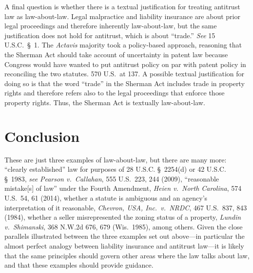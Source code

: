 \documentclass[
  12pt,
  letterpaper,
]{scrartcl}
\begin{document}
A final question is whether there is a textual justification for treating
antitrust law as law-about-law. Legal malpractice and liability insurance are
about prior legal proceedings and therefore inherently law-about-law, but the
same justification does not hold for antitrust, which is about ``trade.''
\textit{See} 15 U.S.C.~§~1. The \textit{Actavis} majority took a policy-based
approach, reasoning that the Sherman Act should take account of uncertainty in
patent law because Congress would have wanted to put antitrust policy on par
with patent policy in reconciling the two statutes. 570 U.S.~at 137. A possible
textual justification for doing so is that the word ``trade'' in the Sherman
Act includes trade in property rights and therefore refers also to the legal
proceedings that enforce those property rights. Thus, the Sherman Act is
textually law-about-law.


\section{Conclusion}

These are just three examples of law-about-law, but there are many more:
``clearly established'' law for purposes of 28 U.S.C. § 2254(d) or 42 U.S.C.
§ 1983, \textit{see} \textit{Pearson v.~Callahan}, 555 U.S.~223, 244 (2009),
``reasonable mistake[s] of law'' under the Fourth Amendment, \textit{Heien
v.~North Carolina}, 574 U.S.~54, 61 (2014), whether a statute is ambiguous and
an agency's interpretation of it reasonable, \textit{Chevron, USA,
Inc.~v.~NRDC}, 467 U.S.~837, 843 (1984), whether a seller misrepresented the
zoning status of a property, \textit{Lundin v.~Shimanski}, 368
N.W.2d 676, 679 (Wis.~1985), among others. Given the close parallels
illustrated between the three examples set out above---in particular the almost
perfect analogy between liability insurance and antitrust law---it is likely
that the same principles should govern other areas where the law talks about
law, and that these examples should provide guidance.
\end{document}
